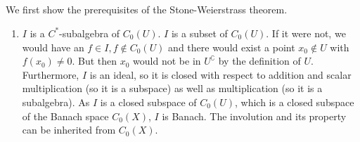 \documentclass[a4paper]{article}
\begin{document}
\subsection{}

We first show the prerequisites of the Stone-Weierstrass theorem.
\begin{enumerate}
    \item $I$ is a $C^*$-subalgebra of $C_0(U)$.
    $I$ is a subset of $C_0(U)$.
    If it were not, we would have an $f \in I, f \notin C_0(U)$ and there would exist a point $x_0 \notin U$ with $f(x_0) \neq 0$.
    But then $x_0$ would not be in $U^\complement$ by the definition of $U$.
    Furthermore, $I$ is an ideal, so it is closed with respect to addition and scalar multiplication (so it is a subspace) as well as multiplication (so it is a subalgebra).
    As $I$ is a closed subspace of $C_0(U)$, which is a closed subspace of the Banach space $C_0(X)$, $I$ is Banach.
    The involution and its property can be inherited from $C_0(X)$.


\end{enumerate}
\end{document}
